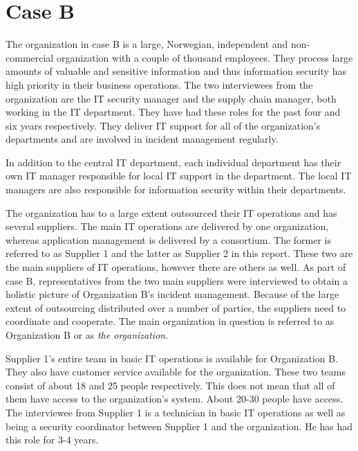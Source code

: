 \documentclass[b5paper, twoside, openright, 11pt]{report}
\begin{document}


\section{Case B}
The organization in case B is a large, Norwegian, independent and non-commercial organization with a couple of thousand employees. They process large amounts of valuable and sensitive information and thus information security has high priority in their business operations. The two interviewees from the organization are the IT security manager and the supply chain manager, both working in the IT department. They have had these roles for the past four and six years respectively. They deliver IT support for all of the organization's departments and are involved in incident management regularly.   

In addition to the central IT department, %
each individual department has their own IT manager responsible for local IT support in the department. The local IT managers are also responsible for information security within their departments.

The organization has to a large extent outsourced their IT operations and has several suppliers. The main IT operations are delivered by one organization, whereas application management is delivered by a consortium. The former is referred to as Supplier 1 and the latter as Supplier 2 in this report. These two are the main suppliers of IT operations, however there are others as well. As part of case B, representatives from the two main suppliers were interviewed to obtain a holistic picture of Organization B's incident management. Because of the large extent of outsourcing distributed over a number of parties, the suppliers need to coordinate and cooperate. The main organization in question is referred to as Organization B or as \textit{the organization}.

Supplier 1's entire team in basic IT operations is available for Organization B. They also have customer service available for the organization. These two teams consist of about 18 and 25 people respectively. This does not mean that all of them have access to the organization's system. About 20-30 people have access. The interviewee from Supplier 1 is a technician in basic IT operations as well as being a security coordinator between Supplier 1 and the organization. He has had this role for 3-4 years.
\end{document}
